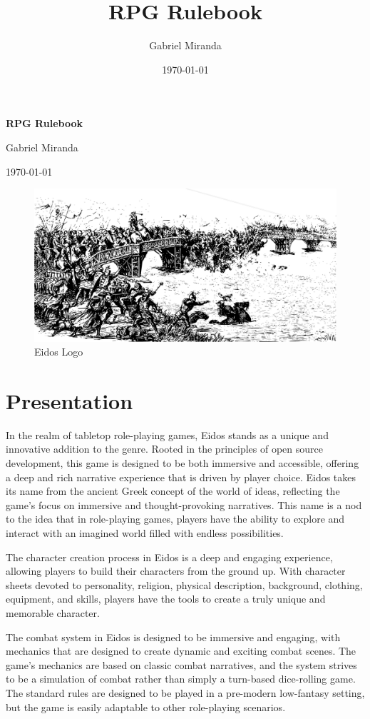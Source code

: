 \documentclass[twocolumn,12pt]{article}  %
\title{RPG Rulebook}
\author{Gabriel Miranda}
\date{\today}
\newcommand{\coverpage}{
    \begin{titlepage}
        \centering
        \vspace*{5cm}
        {\Huge\bfseries RPG Rulebook\par}
        \vspace{1cm}
        {\LARGE Gabriel Miranda\par}
        \vfill
        {\Large \today\par}
    \end{titlepage}
}
\begin{document}
\coverpage

\maketitle

\begin{figure}[h]
    \centering
    \includegraphics[width=\linewidth]{./images/index01.pdf}
    \caption{Eidos Logo}
\end{figure}

\section*{Presentation}
In the realm of tabletop role-playing games, Eidos stands as a unique and innovative addition to the genre. Rooted in the principles of open source development, this game is designed to be both immersive and accessible, offering a deep and rich narrative experience that is driven by player choice. Eidos takes its name from the ancient Greek concept of the world of ideas, reflecting the game's focus on immersive and thought-provoking narratives. This name is a nod to the idea that in role-playing games, players have the ability to explore and interact with an imagined world filled with endless possibilities.

The character creation process in Eidos is a deep and engaging experience, allowing players to build their characters from the ground up. With character sheets devoted to personality, religion, physical description, background, clothing, equipment, and skills, players have the tools to create a truly unique and memorable character.

The combat system in Eidos is designed to be immersive and engaging, with mechanics that are designed to create dynamic and exciting combat scenes. The game's mechanics are based on classic combat narratives, and the system strives to be a simulation of combat rather than simply a turn-based dice-rolling game. The standard rules are designed to be played in a pre-modern low-fantasy setting, but the game is easily adaptable to other role-playing scenarios.
\end{document}
